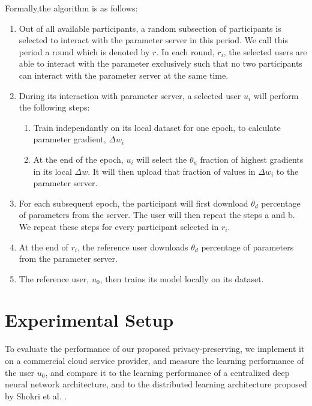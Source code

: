\documentclass[conference]{IEEEtran}
\begin{document}
Formally,the algorithm is as follows:
\begin {enumerate}
\item Out of all available participants, a random subsection of participants is selected to interact with the parameter server in this
period. We call this period a round which is denoted by $r$. In each round, $r_i$, the selected users are able to interact with the parameter exclusively such that no two
participants can interact with the parameter server at the same time.
\item During its interaction with parameter server, a selected user $u_i$ will perform the following steps:
\begin {enumerate}
  \item Train independantly on its local dataset for one epoch, to calculate parameter gradient, $\Delta w_i$ 
  \item  At the end of the epoch, $u_i$ will select the $\theta_u$ fraction of highest gradients in its local $\Delta w$. It will then upload that fraction of values in $\Delta w_i$ to the parameter server.
  \end {enumerate}
\item For each subsequent epoch, the participant will first download $\theta_d$ percentage of parameters from the server. The
user will then repeat the steps a and b. We repeat these steps for every participant selected in $r_i$.
\item At the end of $r_i$, the reference user downloads $\theta_d$ percentage of parameters from the parameter server.
\item The reference user, $u_0$, then trains its model locally on its dataset. 
\end {enumerate}




\section{Experimental Setup}

To evaluate the performance of our proposed privacy-preserving, we implement it on a commercial cloud service provider, and measure the
learning performance of the user $u_0$, and compare it to the learning performance of a centralized deep neural network
architecture, and to the distributed learning architecture proposed by Shokri et al. \cite{shokri2015privacy}. 
\end{document}
